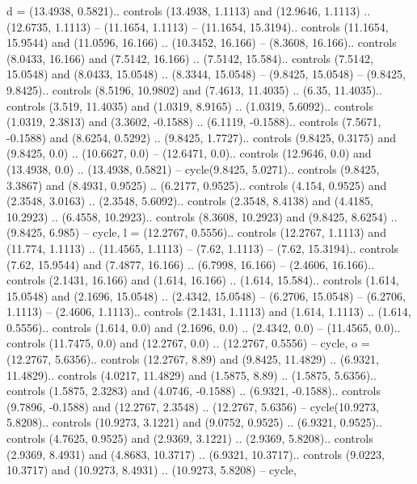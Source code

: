 d = {(13.4938, 0.5821).. controls (13.4938, 1.1113) and (12.9646, 1.1113) .. (12.6735, 1.1113) -- (11.1654, 1.1113) -- (11.1654, 15.3194).. controls (11.1654, 15.9544) and (11.0596, 16.166) .. (10.3452, 16.166) -- (8.3608, 16.166).. controls (8.0433, 16.166) and (7.5142, 16.166) .. (7.5142, 15.584).. controls (7.5142, 15.0548) and (8.0433, 15.0548) .. (8.3344, 15.0548) -- (9.8425, 15.0548) -- (9.8425, 9.8425).. controls (8.5196, 10.9802) and (7.4613, 11.4035) .. (6.35, 11.4035).. controls (3.519, 11.4035) and (1.0319, 8.9165) .. (1.0319, 5.6092).. controls (1.0319, 2.3813) and (3.3602, -0.1588) .. (6.1119, -0.1588).. controls (7.5671, -0.1588) and (8.6254, 0.5292) .. (9.8425, 1.7727).. controls (9.8425, 0.3175) and (9.8425, 0.0) .. (10.6627, 0.0) -- (12.6471, 0.0).. controls (12.9646, 0.0) and (13.4938, 0.0) .. (13.4938, 0.5821) -- cycle(9.8425, 5.0271).. controls (9.8425, 3.3867) and (8.4931, 0.9525) .. (6.2177, 0.9525).. controls (4.154, 0.9525) and (2.3548, 3.0163) .. (2.3548, 5.6092).. controls (2.3548, 8.4138) and (4.4185, 10.2923) .. (6.4558, 10.2923).. controls (8.3608, 10.2923) and (9.8425, 8.6254) .. (9.8425, 6.985) -- cycle},
l = {(12.2767, 0.5556).. controls (12.2767, 1.1113) and (11.774, 1.1113) .. (11.4565, 1.1113) -- (7.62, 1.1113) -- (7.62, 15.3194).. controls (7.62, 15.9544) and (7.4877, 16.166) .. (6.7998, 16.166) -- (2.4606, 16.166).. controls (2.1431, 16.166) and (1.614, 16.166) .. (1.614, 15.584).. controls (1.614, 15.0548) and (2.1696, 15.0548) .. (2.4342, 15.0548) -- (6.2706, 15.0548) -- (6.2706, 1.1113) -- (2.4606, 1.1113).. controls (2.1431, 1.1113) and (1.614, 1.1113) .. (1.614, 0.5556).. controls (1.614, 0.0) and (2.1696, 0.0) .. (2.4342, 0.0) -- (11.4565, 0.0).. controls (11.7475, 0.0) and (12.2767, 0.0) .. (12.2767, 0.5556) -- cycle},
o = {(12.2767, 5.6356).. controls (12.2767, 8.89) and (9.8425, 11.4829) .. (6.9321, 11.4829).. controls (4.0217, 11.4829) and (1.5875, 8.89) .. (1.5875, 5.6356).. controls (1.5875, 2.3283) and (4.0746, -0.1588) .. (6.9321, -0.1588).. controls (9.7896, -0.1588) and (12.2767, 2.3548) .. (12.2767, 5.6356) -- cycle(10.9273, 5.8208).. controls (10.9273, 3.1221) and (9.0752, 0.9525) .. (6.9321, 0.9525).. controls (4.7625, 0.9525) and (2.9369, 3.1221) .. (2.9369, 5.8208).. controls (2.9369, 8.4931) and (4.8683, 10.3717) .. (6.9321, 10.3717).. controls (9.0223, 10.3717) and (10.9273, 8.4931) .. (10.9273, 5.8208) -- cycle},
